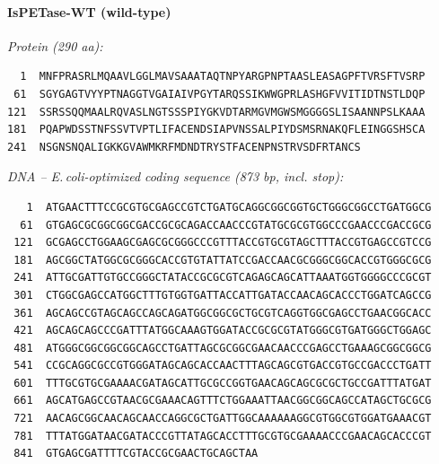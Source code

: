 \documentclass[11pt]{article}
\begin{document}
\paragraph{IsPETase-WT  (wild-type)}
\noindent\textit{Protein (290 aa):}
\begin{verbatim}
  1  MNFPRASRLMQAAVLGGLMAVSAAATAQTNPYARGPNPTAASLEASAGPFTVRSFTVSRP
 61  SGYGAGTVYYPTNAGGTVGAIAIVPGYTARQSSIKWWGPRLASHGFVVITIDTNSTLDQP
121  SSRSSQQMAALRQVASLNGTSSSPIYGKVDTARMGVMGWSMGGGGSLISAANNPSLKAAA
181  PQAPWDSSTNFSSVTVPTLIFACENDSIAPVNSSALPIYDSMSRNAKQFLEINGGSHSCA
241  NSGNSNQALIGKKGVAWMKRFMDNDTRYSTFACENPNSTRVSDFRTANCS
\end{verbatim}
\medskip
\noindent\textit{DNA -- E.\,coli-optimized coding sequence (873 bp, incl. stop):}
\begin{verbatim}
   1  ATGAACTTTCCGCGTGCGAGCCGTCTGATGCAGGCGGCGGTGCTGGGCGGCCTGATGGCG
  61  GTGAGCGCGGCGGCGACCGCGCAGACCAACCCGTATGCGCGTGGCCCGAACCCGACCGCG
 121  GCGAGCCTGGAAGCGAGCGCGGGCCCGTTTACCGTGCGTAGCTTTACCGTGAGCCGTCCG
 181  AGCGGCTATGGCGCGGGCACCGTGTATTATCCGACCAACGCGGGCGGCACCGTGGGCGCG
 241  ATTGCGATTGTGCCGGGCTATACCGCGCGTCAGAGCAGCATTAAATGGTGGGGCCCGCGT
 301  CTGGCGAGCCATGGCTTTGTGGTGATTACCATTGATACCAACAGCACCCTGGATCAGCCG
 361  AGCAGCCGTAGCAGCCAGCAGATGGCGGCGCTGCGTCAGGTGGCGAGCCTGAACGGCACC
 421  AGCAGCAGCCCGATTTATGGCAAAGTGGATACCGCGCGTATGGGCGTGATGGGCTGGAGC
 481  ATGGGCGGCGGCGGCAGCCTGATTAGCGCGGCGAACAACCCGAGCCTGAAAGCGGCGGCG
 541  CCGCAGGCGCCGTGGGATAGCAGCACCAACTTTAGCAGCGTGACCGTGCCGACCCTGATT
 601  TTTGCGTGCGAAAACGATAGCATTGCGCCGGTGAACAGCAGCGCGCTGCCGATTTATGAT
 661  AGCATGAGCCGTAACGCGAAACAGTTTCTGGAAATTAACGGCGGCAGCCATAGCTGCGCG
 721  AACAGCGGCAACAGCAACCAGGCGCTGATTGGCAAAAAAGGCGTGGCGTGGATGAAACGT
 781  TTTATGGATAACGATACCCGTTATAGCACCTTTGCGTGCGAAAACCCGAACAGCACCCGT
 841  GTGAGCGATTTTCGTACCGCGAACTGCAGCTAA
\end{verbatim}
\bigskip
\end{document}
